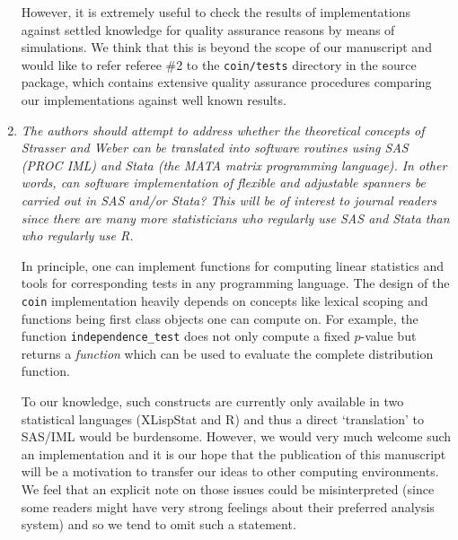 \documentclass[11pt]{article}
\begin{document}
\begin{enumerate}
However, it is extremely useful to check the results of implementations
against settled knowledge for quality assurance reasons by means of
simulations. We
think that this is beyond the scope of our manuscript and would like to
refer referee \#2 to the \texttt{coin/tests} directory in the source
package, which contains extensive quality assurance procedures comparing our
implementations against well known results.

\item \textsl{The authors should attempt to address whether the theoretical concepts of
              Strasser and Weber can be translated into software routines using 
              SAS (PROC IML) and Stata (the MATA matrix programming language). In other 
              words, can software implementation of flexible and adjustable
              spanners be carried out in SAS and/or Stata? This will be of interest to
              journal readers since there are many more statisticians who regularly use 
              SAS and Stata than who regularly use R.}

In principle, one can implement functions for computing linear statistics
and tools for corresponding tests in any programming language. The design of
the \texttt{coin} implementation heavily depends on concepts like lexical
scoping and functions being first class objects one can compute on. For
example, the function \texttt{independence\_test} does not only compute a
fixed $p$-value but returns a \textit{function} which can be used to
evaluate the complete distribution function.

To our knowledge, such constructs are currently only available in two
statistical languages (\textsf{XLispStat} and \textsf{R}) and thus a direct
`translation' to \textsf{SAS/IML} would be burdensome. However, we would
very much welcome such an implementation and it is our hope that the
publication of this manuscript will be a motivation to transfer our ideas
to other computing environments. We feel that an explicit note on those
issues could be misinterpreted (since some readers might have very strong 
feelings about their preferred analysis system) and so we tend to omit 
such a statement.

\end{enumerate}
\end{document}
